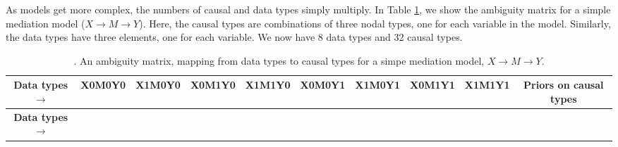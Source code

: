 \documentclass[12pt,]{book}
\begin{document}
As models get more complex, the numbers of causal and data types simply multiply. In Table \ref{tab:ambigmatrixmed}, we show the ambiguity matrix for a simple mediation model (\(X \rightarrow M \rightarrow Y\)). Here, the causal types are combinations of three nodal types, one for each variable in the model. Similarly, the data types have three elements, one for each variable. We now have 8 data types and 32 causal types.

\begin{longtable}[]{@{}cccccccccc@{}}
\caption{\label{tab:ambigmatrixmed}. An ambiguity matrix, mapping from data types to causal types for a simpe mediation model, \(X \rightarrow M \rightarrow Y\).}\tabularnewline
\toprule
\begin{minipage}[b]{0.23\columnwidth}\centering
\textbf{Data types} \(\rightarrow\)\strut
\end{minipage} & \begin{minipage}[b]{0.05\columnwidth}\centering
X0M0Y0\strut
\end{minipage} & \begin{minipage}[b]{0.05\columnwidth}\centering
X1M0Y0\strut
\end{minipage} & \begin{minipage}[b]{0.05\columnwidth}\centering
X0M1Y0\strut
\end{minipage} & \begin{minipage}[b]{0.05\columnwidth}\centering
X1M1Y0\strut
\end{minipage} & \begin{minipage}[b]{0.05\columnwidth}\centering
X0M0Y1\strut
\end{minipage} & \begin{minipage}[b]{0.05\columnwidth}\centering
X1M0Y1\strut
\end{minipage} & \begin{minipage}[b]{0.05\columnwidth}\centering
X0M1Y1\strut
\end{minipage} & \begin{minipage}[b]{0.05\columnwidth}\centering
X1M1Y1\strut
\end{minipage} & \begin{minipage}[b]{0.14\columnwidth}\centering
Priors on causal types\strut
\end{minipage}\tabularnewline
\midrule
\endfirsthead
\toprule
\begin{minipage}[b]{0.23\columnwidth}\centering
\textbf{Data types} \(\rightarrow\)\strut
\end{minipage} & \begin{minipage}[b]{0.05\columnwidth}\centering

\end{minipage}
\end{longtable}
\end{document}
